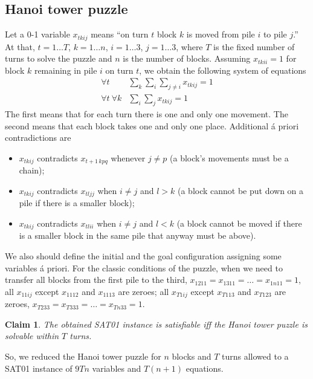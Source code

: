 \documentclass[11pt]{article}
\newtheorem{claim}{Claim}
\begin{document}
\subsection{Hanoi tower puzzle}
Let a 0-1 variable $x_{tkij}$ means ``on turn $t$ block $k$ is moved from pile $i$ to pile $j$.'' At that, $t=1 \ldots T$, $k=1 \ldots n$, $i=1 \ldots 3$, $j=1 \ldots 3$, where $T$ is the fixed number of turns to solve the puzzle and $n$ is the number of blocks. Assuming $x_{tkii}=1$ for block $k$ remaining in pile $i$ on turn $t$, we obtain the following system of equations
\begin{equation}
\label{eq:htp2sat01}
\begin{array}{lr}
\forall t & \sum_k \sum_i \sum_{j \ne i} x_{tkij} =1 \\
\forall t \ \forall k & \sum_i \sum_j x_{tkij} =1
\end{array}
\end{equation}
The first means that for each turn there is one and only one movement. The second means that each block takes one and only one place. Additional \'a priori contradictions are
\begin{itemize}
\item $x_{tkij}$ contradicts $x_{t+1\,kpq}$ whenever $j \ne p$ (a block's movements must be a chain);
\item $x_{tkij}$ contradicts $x_{tljj}$ when $i \ne j$ and $l>k$ (a block cannot be put down on a pile if there is a smaller block);
\item $x_{tkij}$ contradicts $x_{tlii}$ when $i \ne j$ and $l<k$ (a block cannot be moved if there is a smaller block in the same pile that anyway must be above).
\end{itemize}
We also should define the initial and the goal configuration assigning some variables \'a priori. For the classic conditions of the puzzle, when we need to transfer all blocks from the first pile to the third, $x_{1211}=x_{1311}= \ldots =x_{1n11}=1$, all $x_{11ij}$ except $x_{1112}$ and $x_{1113}$ are zeroes; all $x_{T1ij}$ except $x_{T113}$ and $x_{T123}$ are zeroes, $x_{T233}=x_{T333}= \ldots =x_{Tn33}=1$.
\begin{claim}
The obtained SAT01 instance is satisfiable iff the Hanoi tower puzzle is solvable within $T$ turns.
\end{claim}

So, we reduced the Hanoi tower puzzle for $n$ blocks and $T$ turns allowed to a SAT01 instance of $9Tn$ variables and $T(n+1)$ equations.
\end{document}
